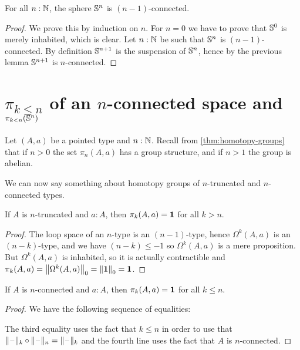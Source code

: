 \begin{cor} \label{cor:sn-connected}
  For all $n:\N$, the sphere $\Sn^n$ is $(n-1)$-connected.
\end{cor}

\begin{proof}
  We prove this by induction on $n$.
  For $n=0$ we have to prove that $\Sn^0$ is merely inhabited, which is clear.
  Let $n:\N$ be such that $\Sn^n$ is $(n-1)$-connected. By definition $\Sn^{n+1}$
  is the suspension of $\Sn^n$, hence by the previous lemma $\Sn^{n+1}$ is
  $n$-connected.
\end{proof}

\section{\texorpdfstring{$\pi_{k \le n}$}{π\_(k≤n)} of an \texorpdfstring{$n$}{n}-connected space and \texorpdfstring{$\pi_{k < n}(\Sn ^n)$}{π\_(k<n)(Sⁿ)}}
\label{sec:pik-le-n}

Let $(A,a)$ be a pointed type and $n:\N$.  Recall from
\autoref{thm:homotopy-groups} that if $n>0$ the set $\pi_n(A,a)$ has a group
structure, and if $n>1$ the group is abelian.

We can now say something about homotopy groups of $n$-truncated and
$n$-connected types.

\begin{lem}
  If $A$ is $n$-truncated and $a:A$, then $\pi_k(A,a)=\unit$ for all $k>n$.
\end{lem}

\begin{proof}
  The loop space of an $n$-type  is an
  $(n-1)$-type, hence $\Omega^k(A,a)$ is an $(n-k)$-type, and we have
  $(n-k)\le-1$ so $\Omega^k(A,a)$ is a mere proposition. But $\Omega^k(A,a)$ is inhabited,
  so it is actually contractible and
  $\pi_k(A,a)=\trunc0{\Omega^k(A,a)}=\trunc0{\unit}=\unit$.
\end{proof}

\begin{lem} \label{lem:pik-nconnected}
  If $A$ is $n$-connected and $a:A$, then $\pi_k(A,a)=\unit$ for all $k\le{}n$.
\end{lem}

\begin{proof}
  We have the following sequence of equalities:
  The third equality uses the fact that $k\le{}n$ in order to use that
  $\truncf k\circ\truncf n=\truncf k$ and the fourth line uses the fact that $A$ is
  $n$-connected.
\end{proof}

